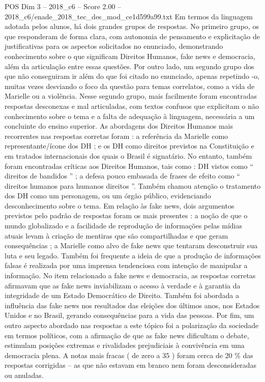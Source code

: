 \begin{textsample}{POS Dim 3 – 2018\_c6 – Score 2.00 – 2018\_c6/enade\_2018\_tec\_des\_mod\_ce1d599a99.txt}
Em termos da linguagem adotada pelos alunos, há dois grandes grupos de respostas.
No primeiro grupo, os que responderam de forma clara, com autonomia de pensamento e explicitação de justificativas para os aspectos solicitados no enunciado, demonstrando conhecimento sobre o que significam Direitos Humanos, fake news e democracia, além da articulação entre essas questões.
Por outro lado, um segundo grupo dos que não conseguiram ir além do que foi citado no enunciado, apenas repetindo -o, muitas vezes desviando o foco da questão para temas correlatos, como a vida de Marielle ou a violência.
Nesse segundo grupo, mais facilmente foram encontradas respostas desconexas e mal articuladas, com textos confusos que explicitam o não conhecimento sobre o tema e a falta de adequação à linguagem, necessária a um concluinte do ensino superior.
As abordagens dos Direitos Humanos mais recorrentes nas respostas corretas foram : a referência da Marielle como representante/ícone dos DH ; e os DH como direitos previstos na Constituição e em tratados internacionais dos quais o Brasil é signatário.
No entanto, também foram encontradas críticas aos Direitos Humanos, tais como : DH vistos como “ direitos de bandidos ” ; a defesa pouco embasada de frases de efeito como “ direitos humanos para humanos direitos ”.
Também chamou atenção o tratamento dos DH como um personagem, ou um órgão público, evidenciando desconhecimento sobre o tema.
Em relação às fake news, dois argumentos previstos pelo padrão de respostas foram os mais presentes : a noção de que o mundo globalizado e a facilidade de reprodução de informações pelas mídias atuais levam à criação de mentiras que são compartilhadas e que geram consequências ; a Marielle como alvo de fake news que tentaram desconstruir sua luta e seu legado.
Também foi frequente a ideia de que a produção de informações falsas é realizada por uma imprensa tendenciosa com intenção de manipular a informação.
No item relacionado a fake news e democracia, as respostas corretas afirmavam que as fake news inviabilizam o acesso à verdade e à garantia da integridade de um Estado Democrático de Direito.
Também foi abordada a influência das fake news nos resultados das eleições dos últimos anos, nos Estados Unidos e no Brasil, gerando consequências para a vida das pessoas.
Por fim, um outro aspecto abordado nas respostas a este tópico foi a polarização da sociedade em termos políticos, com a afirmação de que as fake news dificultam o debate, estimulam posições extremas e rivalidades prejudiciais à convivência em uma democracia plena.
A notas mais fracas ( de zero a 35 ) foram cerca de 20 \% das respostas corrigidas – as que não estavam em branco nem foram desconsideradas ou anuladas.

\end{textsample}

